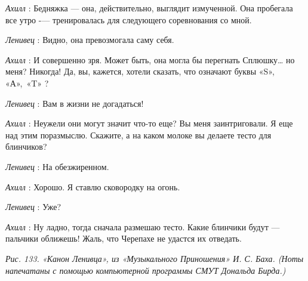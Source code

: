 \documentclass[../main.tex]{subfiles}
\begin{document}
\begin{dialogue}
\emph{Ахилл} : Бедняжка --- она, действительно, выглядит измученной. Она пробегала все утро -\/--- тренировалась для следующего соревнования со мной.

\emph{Ленивец} : Видно, она превозмогала саму себя.

\emph{Ахилл} : И совершенно зря. Может быть, она могла бы перегнать Сплюшку\ldots{} но меня? Никогда! Да, вы, кажется, хотели сказать, что означают буквы «S», «А»,~«T» ?

\emph{Ленивец} : Вам в жизни не догадаться!

\emph{Ахилл} : Неужели они могут значит что-то еще? Вы меня заинтриговали. Я еще над этим поразмыслю. Скажите, а на каком молоке вы делаете тесто для блинчиков?

\emph{Ленивец} : На обезжиренном.

\emph{Ахилл} : Хорошо. Я ставлю сковородку на огонь.

\emph{Ленивец} : Уже?

\emph{Ахилл} : Ну ладно, тогда сначала размешаю тесто. Какие блинчики будут --- пальчики оближешь! Жаль, что Черепахе не удастся их отведать.

\emph{Рис. 133. «Канон Ленивца», из «Музыкального Приношения» И. С. Баха. (Ноты напечатаны с помощью компьютерной программы СМУТ Дональда Бирда.)}

\end{dialogue}
\end{document}
